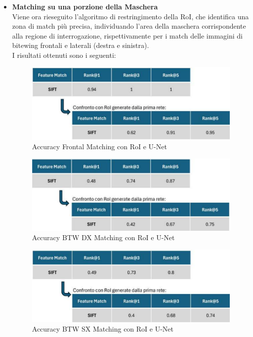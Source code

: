 \documentclass[12pt,a4paper,openright,twoside]{book}
\begin{document}
\begin{itemize}
\item \textbf{Matching su una porzione della Maschera}\\
Viene ora rieseguito l'algoritmo di restringimento della RoI, che identifica una zona di match più precisa, individuando l'area della maschera corrispondente alla regione di interrogazione, rispettivamente per i match delle immagini di bitewing frontali e laterali (destra e sinistra).\\
I risultati ottenuti sono i seguenti:
\begin{figure}[H]
	\centering
	\includegraphics{figures/frontal5_1.pdf}
   	\caption{Accuracy Frontal Matching con RoI e U-Net}
	\label{fig:frontal5}
\end{figure}
\begin{figure}[H]
	\centering
	\includegraphics{figures/dx5_1.pdf}
    	\caption{Accuracy BTW DX Matching con RoI e U-Net}
	\label{fig:dx5}
\end{figure}
\begin{figure}[H]
	\centering
	\includegraphics{figures/sx5_1.pdf}
    	\caption{Accuracy BTW SX Matching con RoI e U-Net}

\end{figure}
\end{itemize}
\end{document}
